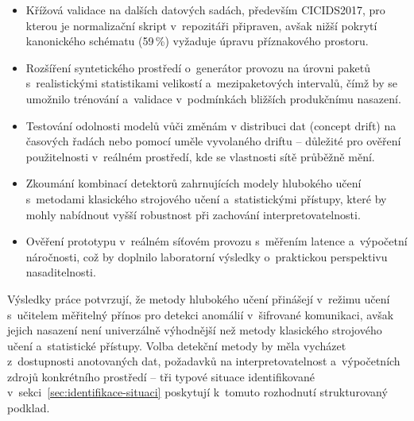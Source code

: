 \begin{itemize}
\item Křížová validace na dalších datových sadách, především CICIDS2017, pro kterou je normalizační skript v~repozitáři připraven, avšak nižší pokrytí kanonického schématu (59\,\%) vyžaduje úpravu příznakového prostoru.

\item Rozšíření syntetického prostředí o~generátor provozu na úrovni paketů s~realistickými statistikami velikostí a~mezipaketových intervalů, čímž by se umožnilo trénování a~validace v~podmínkách bližších produkčnímu nasazení.

\item Testování odolnosti modelů vůči změnám v distribuci dat (concept drift) na časových řadách nebo pomocí uměle vyvolaného driftu – důležité pro ověření použitelnosti v~reálném prostředí, kde se vlastnosti sítě průběžně mění.

\item Zkoumání kombinací detektorů zahrnujících modely hlubokého učení s~metodami klasického strojového učení a~statistickými přístupy, které by mohly nabídnout vyšší robustnost při zachování interpretovatelnosti.

\item Ověření prototypu v~reálném síťovém provozu s~měřením latence a~výpočetní náročnosti, což by doplnilo laboratorní výsledky o~praktickou perspektivu nasaditelnosti.
\end{itemize}

Výsledky práce potvrzují, že metody hlubokého učení přinášejí v~režimu učení s~učitelem měřitelný přínos pro detekci anomálií v~šifrované komunikaci, avšak jejich nasazení není univerzálně výhodnější než metody klasického strojového učení a~statistické přístupy. Volba detekční metody by měla vycházet z~dostupnosti anotovaných dat, požadavků na interpretovatelnost a~výpočetních zdrojů konkrétního prostředí -- tři typové situace identifikované v~sekci~\ref{sec:identifikace-situaci} poskytují k~tomuto rozhodnutí strukturovaný podklad.
